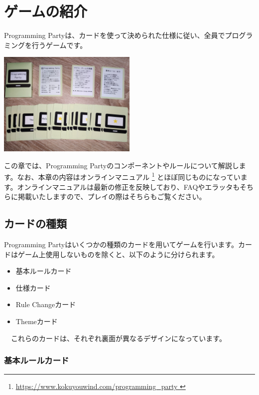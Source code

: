 \documentclass[index]{subfiles}
\begin{document}
  \chapter{ゲームの紹介}
  \label{ch:first}

  Programming Partyは、カードを使って決められた仕様に従い、全員でプログラミングを行うゲームです。
  
  \begin{center}
    \includegraphics[height=5cm]{image/100_game_cards.jpg}
  \end{center}

  この章では、Programming Partyのコンポーネントやルールについて解説します。なお、本章の内容はオンラインマニュアル \footnote{ \url{ https://www.kokuyouwind.com/programming_party }} とほぼ同じものになっています。オンラインマニュアルは最新の修正を反映しており、FAQやエラッタもそちらに掲載いたしますので、プレイの際はそちらもご覧ください。

  \section{カードの種類}
  \label{sec:game_cardtype}

  Programming Partyはいくつかの種類のカードを用いてゲームを行います。カードはゲーム上使用しないものを除くと、以下のように分けられます。
  
  \begin{itemize}
  \item 基本ルールカード
  \item 仕様カード
  \item Rule Changeカード
  \item Themeカード
  \end{itemize}

　これらのカードは、それぞれ裏面が異なるデザインになっています。

  \subsection{基本ルールカード}
\end{document}
